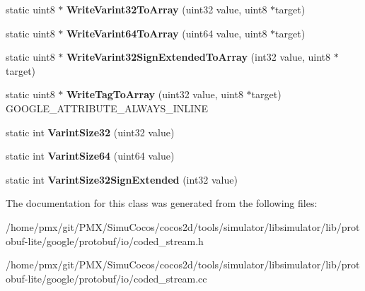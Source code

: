\begin{DoxyCompactItemize}
static uint8 $\ast$ {\bfseries Write\+Varint32\+To\+Array} (uint32 value, uint8 $\ast$target)
\item 
\mbox{\label{classgoogle_1_1protobuf_1_1io_1_1CodedOutputStream_a0e5d2639bfcc0faec224586aa7c7cc7e}} 
static uint8 $\ast$ {\bfseries Write\+Varint64\+To\+Array} (uint64 value, uint8 $\ast$target)
\item 
\mbox{\label{classgoogle_1_1protobuf_1_1io_1_1CodedOutputStream_af16f5baf261792fa9cc659012ad7faad}} 
static uint8 $\ast$ {\bfseries Write\+Varint32\+Sign\+Extended\+To\+Array} (int32 value, uint8 $\ast$target)
\item 
\mbox{\label{classgoogle_1_1protobuf_1_1io_1_1CodedOutputStream_ae0c26197a21a787223ea95f13b9c53ff}} 
static uint8 $\ast$ {\bfseries Write\+Tag\+To\+Array} (uint32 value, uint8 $\ast$target) G\+O\+O\+G\+L\+E\+\_\+\+A\+T\+T\+R\+I\+B\+U\+T\+E\+\_\+\+A\+L\+W\+A\+Y\+S\+\_\+\+I\+N\+L\+I\+NE
\item 
\mbox{\label{classgoogle_1_1protobuf_1_1io_1_1CodedOutputStream_a544954205cb72aa0ee8c94dcd49f809e}} 
static int {\bfseries Varint\+Size32} (uint32 value)
\item 
\mbox{\label{classgoogle_1_1protobuf_1_1io_1_1CodedOutputStream_a9b410a3a31ee0623fed6c38e4481ad33}} 
static int {\bfseries Varint\+Size64} (uint64 value)
\item 
\mbox{\label{classgoogle_1_1protobuf_1_1io_1_1CodedOutputStream_af3e02f63e1f7bb0f78cfb277cf7b3818}} 
static int {\bfseries Varint\+Size32\+Sign\+Extended} (int32 value)
\end{DoxyCompactItemize}


The documentation for this class was generated from the following files\+:\begin{DoxyCompactItemize}
\item 
/home/pmx/git/\+P\+M\+X/\+Simu\+Cocos/cocos2d/tools/simulator/libsimulator/lib/protobuf-\/lite/google/protobuf/io/coded\+\_\+stream.\+h\item 
/home/pmx/git/\+P\+M\+X/\+Simu\+Cocos/cocos2d/tools/simulator/libsimulator/lib/protobuf-\/lite/google/protobuf/io/coded\+\_\+stream.\+cc\end{DoxyCompactItemize}
